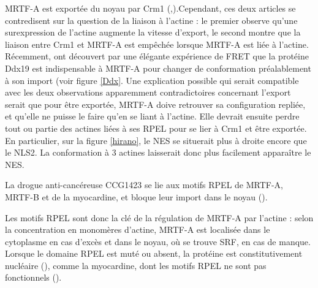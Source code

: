  MRTF-A est exportée du noyau par Crm1 (\cite{vartiainen_nuclear_2007},\cite{hayashi_differences_2013}).Cependant, ces deux articles se contredisent sur la question de la liaison à l'actine : le premier observe qu'une surexpression de l'actine augmente la vitesse d'export, le second montre que la liaison entre Crm1 et MRTF-A est empêchée lorsque MRTF-A est liée à l'actine. Récemment, \cite{rajakyla_rna_2015} ont découvert par une élégante expérience de FRET que la protéine Ddx19 est indispensable à MRTF-A pour changer de conformation préalablement à son import (voir figure \ref{Ddx}. Une explication possible qui serait compatible avec les deux observations apparemment contradictoires concernant l'export serait que pour être exportée, MRTF-A doive retrouver sa configuration repliée, et qu'elle ne puisse le faire qu'en se liant à l'actine. Elle devrait ensuite perdre tout ou partie des actines liées à ses RPEL pour se lier à Crm1 et être exportée. En particulier, sur la figure \ref{hirano}, le NES se situerait plus à droite encore que le NLS2. La conformation à 3 actines laisserait donc plus facilement apparaître le NES. 
 
 La drogue anti-cancéreuse CCG1423 se lie aux motifs RPEL de MRTF-A, MRTF-B et de la myocardine, et bloque leur import dans le noyau (\cite{hayashi_2014}). 
 
 Les motifs RPEL sont donc la clé de la régulation de MRTF-A par l'actine : selon la concentration en monomères d'actine, MRTF-A est localisée dans le cytoplasme en cas d'excès et dans le noyau, où se trouve SRF, en cas de manque. Lorsque le domaine RPEL est muté ou absent, la protéine est constitutivement nucléaire (\cite{miralles_actin_2003}), comme la myocardine, dont les motifs RPEL ne sont pas fonctionnels (\cite{guettler_rpel_2008}). 
 
